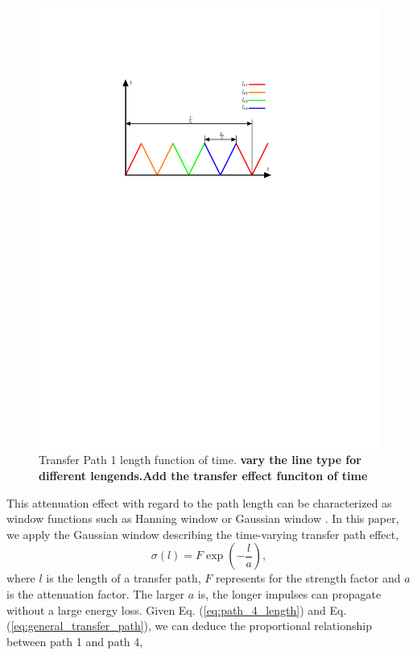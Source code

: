 \documentclass[a4paper,fleqn]{cas-sc}%
\begin{document}
\begin{figure}[pos=htbp]
    \centering
    \includegraphics[scale=0.5]{trangle_wave.pdf}
    \caption{Transfer Path 1 length function of time. \textbf{vary the line type for different lengends.Add the transfer effect funciton of time}}
    \label{fig:path_length_trangle_wave}
\end{figure}
\par This attenuation effect with regard to the path length can be characterized as window functions such as Hanning window or Gaussian window \cite{Mark2009}. In this paper, we apply the Gaussian window describing the time-varying transfer path effect,
\begin{equation}
    \sigma(l)=F\exp\left(-\frac{l}{a}\right),\label{eq:general_transfer_path}
\end{equation}
where $l$ is the length of a transfer path, $F$ represents for the strength factor and $a$ is the attenuation factor. The larger $a$ is, the longer impulses can propagate without a large energy loss. Given Eq. (\ref{eq:path_4_length}) and Eq. (\ref{eq:general_transfer_path}), we can deduce the proportional relationship between path 1 and path 4,
\end{document}
